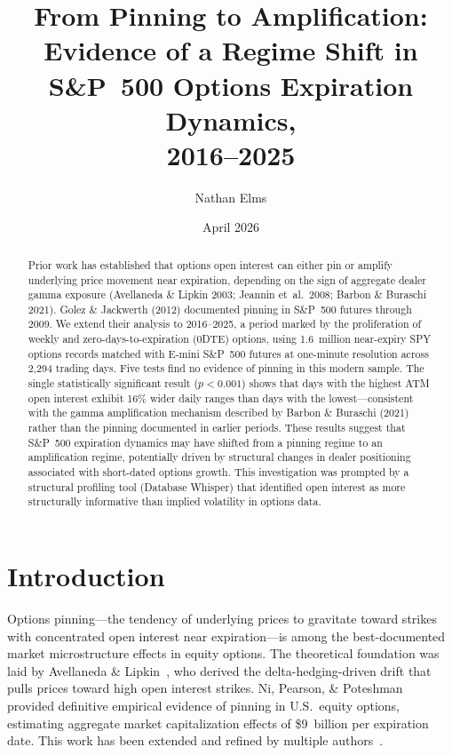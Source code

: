 \documentclass[11pt]{article}
\title{From Pinning to Amplification:\\Evidence of a Regime Shift in S\&P~500 Options Expiration Dynamics,\\2016--2025}
\author{Nathan Elms}
\affil{Independent Researcher}
\date{April 2026}
\begin{document}
\maketitle

\begin{abstract}
Prior work has established that options open interest can either pin or amplify underlying price movement near expiration, depending on the sign of aggregate dealer gamma exposure (Avellaneda \& Lipkin 2003; Jeannin et~al.\ 2008; Barbon \& Buraschi 2021). Golez \& Jackwerth (2012) documented pinning in S\&P~500 futures through 2009. We extend their analysis to 2016--2025, a period marked by the proliferation of weekly and zero-days-to-expiration (0DTE) options, using 1.6~million near-expiry SPY options records matched with E-mini S\&P~500 futures at one-minute resolution across 2{,}294 trading days. Five tests find no evidence of pinning in this modern sample. The single statistically significant result ($p < 0.001$) shows that days with the highest ATM open interest exhibit 16\% wider daily ranges than days with the lowest---consistent with the gamma amplification mechanism described by Barbon \& Buraschi (2021) rather than the pinning documented in earlier periods. These results suggest that S\&P~500 expiration dynamics may have shifted from a pinning regime to an amplification regime, potentially driven by structural changes in dealer positioning associated with short-dated options growth. This investigation was prompted by a structural profiling tool (Database Whisper) that identified open interest as more structurally informative than implied volatility in options data.
\end{abstract}

\section{Introduction}

Options pinning---the tendency of underlying prices to gravitate toward strikes with concentrated open interest near expiration---is among the best-documented market microstructure effects in equity options. The theoretical foundation was laid by Avellaneda \& Lipkin~\cite{avellaneda2003}, who derived the delta-hedging-driven drift that pulls prices toward high open interest strikes. Ni, Pearson, \& Poteshman~\cite{ni2005} provided definitive empirical evidence of pinning in U.S.\ equity options, estimating aggregate market capitalization effects of \$9~billion per expiration date. This work has been extended and refined by multiple authors~\cite{jeannin2008,filippou2022,chung2013}.
\end{document}
